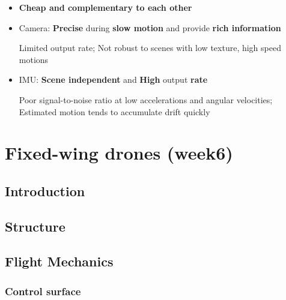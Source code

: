 \documentclass[]{article}
\begin{document}
\begin{itemize}
  \begin{itemize}
  \item
    \textbf{Cheap and complementary to each other}
  \item
    Camera: \textbf{Precise} during \textbf{slow motion} and provide
    \textbf{rich information}

    Limited output rate; Not robust to scenes with low texture, high
    speed motions
  \item
    IMU: \textbf{Scene independent} and \textbf{High} output
    \textbf{rate}

    Poor signal-to-noise ratio at low accelerations and angular
    velocities; Estimated motion tends to accumulate drift quickly
  \end{itemize}
\end{itemize}

\section{Fixed-wing drones (week6)}\label{header-n1146}

\subsection{Introduction}\label{header-n1147}

\subsection{Structure}\label{header-n1148}

\subsection{Flight Mechanics}\label{header-n1149}

\subsubsection{Control surface}\label{header-n1150}
\end{document}
